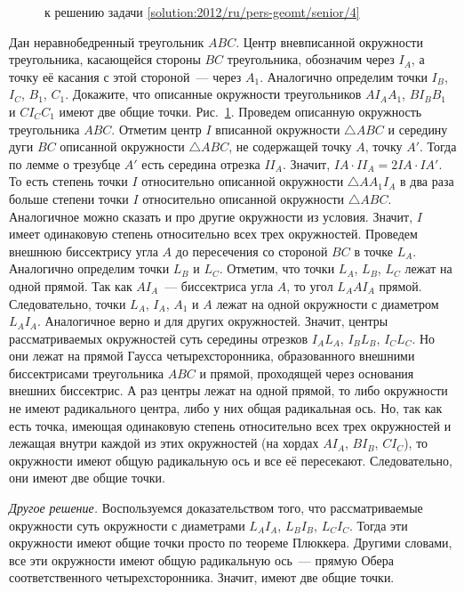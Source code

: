 \ifsolution
\begin{figure}\centering
    \caption{к решению задачи \ref{solution:2012/ru/pers-geomt/senior/4}}
    \label{fig:solution:2012/ru/pers-geomt/senior/4}
\end{figure}%
\fi %

\problem
Дан неравнобедренный треугольник $ABC$.
Центр вневписанной окружности треугольника, касающейся стороны $BC$
треугольника, обозначим через $I_A$, а точку её касания с этой стороной~---
через $A_1$.
Аналогично определим точки $I_B$, $I_C$, $B_1$, $C_1$.
Докажите, что описанные окружности треугольников
$A I_A A_1$, $B I_B B_1$ и $C I_C C_1$ имеют две общие точки.
\solution
\label{solution:2012/ru/pers-geomt/senior/4}%
Рис.~\ref{fig:solution:2012/ru/pers-geomt/senior/4}.
Проведем описанную окружность треугольника $ABC$.
Отметим центр $I$ вписанной окружности $\triangle ABC$ и середину дуги $BC$
описанной окружности $\triangle ABC$, не содержащей точку $A$, точку $A'$.
Тогда по лемме о трезубце $A'$ есть середина отрезка $I I_A$.
Значит, $I A \cdot I I_A = 2 I A \cdot I A'$.
То есть степень точки $I$ относительно описанной окружности
$\triangle A A_1 I_A$ в два раза больше степени точки $I$ относительно описанной
окружности $\triangle ABC$.
Аналогичное можно сказать и про другие окружности из условия.
Значит, $I$ имеет одинаковую степень относительно всех трех окружностей.
Проведем внешнюю биссектрису угла $A$ до пересечения со стороной $BC$ в
точке $L_A$.
Аналогично определим точки $L_B$ и $L_C$.
Отметим, что точки $L_A$, $L_B$, $L_C$ лежат на одной прямой.
Так как $AI_A$~--- биссектриса угла $A$, то угол $L_AAI_A$ прямой.
Следовательно, точки $L_A$, $I_A$, $A_1$ и $A$ лежат на одной окружности с
диаметром $L_AI_A$.
Аналогичное верно и для других окружностей.
Значит, центры рассматриваемых окружностей суть середины отрезков
$I_A L_A$, $I_B L_B$, $I_C L_C$.
Но они лежат на прямой Гаусса четырехсторонника, образованного внешними
биссектрисами треугольника $ABC$ и прямой, проходящей через основания внешних
биссектрис.
А раз центры лежат на одной прямой, то либо окружности не имеют радикального
центра, либо у них общая радикальная ось.
Но, так как есть точка, имеющая одинаковую степень относительно всех трех
окружностей и лежащая внутри каждой из этих окружностей
(на хордах $A I_A$, $B I_B$, $C I_C$),
то окружности имеют общую радикальную ось и все её пересекают.
Следовательно, они имеют две общие точки.
\par
\emph{Другое решение.}
Воспользуемся доказательством того, что рассматриваемые окружности суть
окружности с диаметрами $L_A I_A$, $L_B I_B$, $L_C I_C$.
Тогда эти окружности имеют общие точки просто по теореме Плюккера.
Другими словами, все эти окружности имеют общую радикальную ось~---
прямую Обера соответственного четырехсторонника.
Значит, имеют две общие точки.
\endproblem
